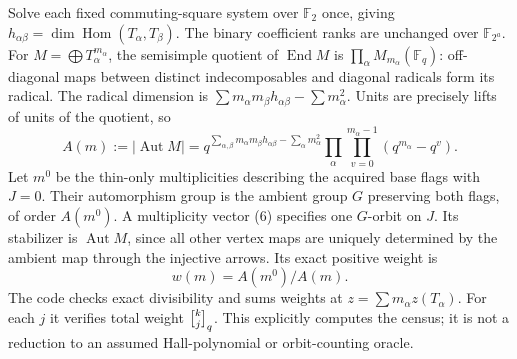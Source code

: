 \documentclass[11pt]{article}
\newcommand{\F}{\mathbb F}\newcommand{\Hom}{\operatorname{Hom}}
\newcommand{\End}{\operatorname{End}}\newcommand{\Aut}{\operatorname{Aut}}
\begin{document}
Solve each fixed commuting-square system over $\F_2$ once, giving
$h_{\alpha\beta}=\dim\Hom(T_\alpha,T_\beta)$. The binary coefficient
ranks are unchanged over $\F_{2^a}$. For
$M=\bigoplus T_\alpha^{m_\alpha}$, the semisimple quotient of
$\End M$ is $\prod_\alpha M_{m_\alpha}(\F_q)$: off-diagonal maps
between distinct indecomposables and diagonal radicals form its radical.
The radical dimension is
$\sum m_\alpha m_\beta h_{\alpha\beta}-\sum m_\alpha^2$.
Units are precisely lifts of units of the quotient, so
\[
 A(m):=|\Aut M|=
 q^{\sum_{\alpha,\beta}m_\alpha m_\beta h_{\alpha\beta}-\sum_\alpha m_\alpha^2}
 \prod_\alpha\prod_{v=0}^{m_\alpha-1}(q^{m_\alpha}-q^v).\tag{7}
\]
Let $m^0$ be the thin-only multiplicities describing the acquired base
flags with $J=0$. Their automorphism group is the ambient group $G$
preserving both flags, of order $A(m^0)$. A multiplicity vector (6)
specifies one $G$-orbit on $J$. Its stabilizer is $\Aut M$, since all
other vertex maps are uniquely determined by the ambient map through
the injective arrows. Its exact positive weight is
\[
 w(m)=A(m^0)/A(m).\tag{8}
\]
The code checks exact divisibility and sums weights at
$z=\sum m_\alpha z(T_\alpha)$. For each $j$ it verifies total weight
${k\brack j}_q$. This explicitly computes the census; it is not a reduction
to an assumed Hall-polynomial or orbit-counting oracle.
\end{document}
